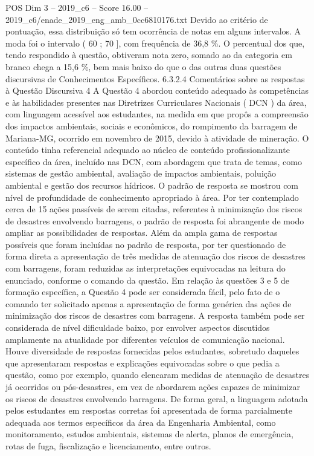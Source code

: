 \begin{textsample}{POS Dim 3 – 2019\_c6 – Score 16.00 – 2019\_c6/enade\_2019\_eng\_amb\_0cc6810176.txt}
Devido ao critério de pontuação, essa distribuição só tem ocorrência de notas em alguns intervalos.
A moda foi o intervalo ( 60 ; 70 ], com frequência de 36,8 \%.
O percentual dos que, tendo respondido à questão, obtiveram nota zero, somado ao da categoria em branco chega a 15,6 \%, bem mais baixo do que o das outras duas questões discursivas de Conhecimentos Específicos. 6.3.2.4 Comentários sobre as respostas à Questão Discursiva 4 A Questão 4 abordou conteúdo adequado às competências e às habilidades presentes nas Diretrizes Curriculares Nacionais ( DCN ) da área, com linguagem acessível aos estudantes, na medida em que propôs a compreensão dos impactos ambientais, sociais e econômicos, do rompimento da barragem de Mariana-MG, ocorrido em novembro de 2015, devido à atividade de mineração.
O conteúdo tinha referencial adequado ao núcleo de conteúdo profissionalizante específico da área, incluído nas DCN, com abordagem que trata de temas, como sistemas de gestão ambiental, avaliação de impactos ambientais, poluição ambiental e gestão dos recursos hídricos.
O padrão de resposta se mostrou com nível de profundidade de conhecimento apropriado à área.
Por ter contemplado cerca de 15 ações passíveis de serem citadas, referentes à minimização dos riscos de desastres envolvendo barragens, o padrão de resposta foi abrangente de modo ampliar as possibilidades de respostas.
Além da ampla gama de respostas possíveis que foram incluídas no padrão de resposta, por ter questionado de forma direta a apresentação de três medidas de atenuação dos riscos de desastres com barragens, foram reduzidas as interpretações equivocadas na leitura do enunciado, conforme o comando da questão.
Em relação às questões 3 e 5 de formação específica, a Questão 4 pode ser considerada fácil, pelo fato de o comando ter solicitado apenas a apresentação de forma genérica das ações de minimização dos riscos de desastres com barragens.
A resposta também pode ser considerada de nível dificuldade baixo, por envolver aspectos discutidos amplamente na atualidade por diferentes veículos de comunicação nacional.
Houve diversidade de respostas fornecidas pelos estudantes, sobretudo daqueles que apresentaram respostas e explicações equivocadas sobre o que pedia a questão, como por exemplo, quando elencaram medidas de atenuação de desastres já ocorridos ou pós-desastres, em vez de abordarem ações capazes de minimizar os riscos de desastres envolvendo barragens.
De forma geral, a linguagem adotada pelos estudantes em respostas corretas foi apresentada de forma parcialmente adequada aos termos específicos da área da Engenharia Ambiental, como monitoramento, estudos ambientais, sistemas de alerta, planos de emergência, rotas de fuga, fiscalização e licenciamento, entre outros.

\end{textsample}
